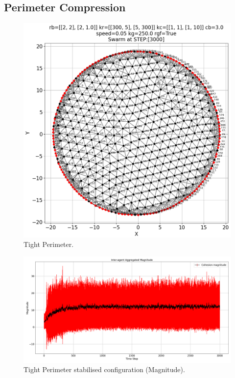 \documentclass[12pt,a4paper]{IEEEtran}
\begin{document}
\subsection{Perimeter Compression}\label{sec:perimCompress}

\begin{figure}[ht]
	\begin{center}
		\includegraphics[width=1.0\linewidth]{figures/tightPerim}
	\end{center}
	\caption{Tight Perimeter. \label{fig:tightPerim}}
\end{figure}

\begin{figure}[H]
	\begin{center}
		\includegraphics[width=1.0\linewidth]{figures/tightPerimMagnitude}
	\end{center}
	\caption{Tight Perimeter stabilised configuration (Magnitude). \label{fig:tightPerimMagnitude}}
\end{figure}
\end{document}
